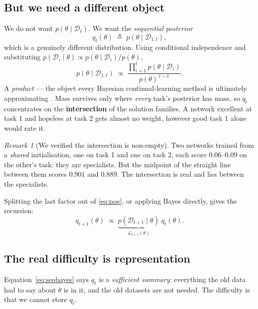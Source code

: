 \documentclass[11pt]{article}
\theoremstyle{definition}
\theoremstyle{plain}
\theoremstyle{remark}
\newtheorem{remark}[definition]{Remark}
\newcommand{\Dt}{\mathcal{D}}
\newcommand{\Lh}{\mathcal{L}}
\begin{document}
\subsection{But we need a different object}

We do not want $p(\theta \mid \Dt_t)$. We want the \emph{sequential posterior}
\begin{equation}
q_t(\theta) \;\triangleq\; p(\theta \mid \Dt_{1:t}),
\end{equation}
which is a genuinely different distribution. Using conditional independence and
substituting $p(\Dt_i\mid\theta) \propto p(\theta\mid\Dt_i)/p(\theta)$,
\begin{equation}
p(\theta \mid \Dt_{1:t}) \;\propto\;
\frac{\prod_{i=1}^{t} p(\theta \mid \Dt_i)}{p(\theta)^{\,t-1}} .
\label{eq:poe}
\end{equation}
A \emph{product} --- the object every Bayesian continual-learning method is
ultimately approximating \cite{vcl}. Mass survives only where \emph{every} task's posterior has
mass, so $q_t$ concentrates on the \textbf{intersection} of the solution
families. A network excellent at task 1 and hopeless at task 2 gets almost no
weight, however good task 1 alone would rate it.

\begin{remark}[We verified the intersection is non-empty]
Two networks trained from a \emph{shared} initialisation, one on task 1 and one
on task 2, each score $0.06$--$0.09$ on the other's task: they are specialists.
But the midpoint of the straight line between them scores $0.901$ and $0.889$.
The intersection is real and lies between the specialists.
\end{remark}

Splitting the last factor out of \eqref{eq:poe}, or applying Bayes directly,
gives the recursion:
\begin{equation}
q_{t+1}(\theta) \;\propto\; \underbrace{p(\Dt_{t+1} \mid \theta)}_{\Lh_{t+1}(\theta)} \; q_t(\theta).
\label{eq:seqbayes}
\end{equation}

\subsection{The real difficulty is representation}

Equation~\eqref{eq:seqbayes} says $q_t$ is a \emph{sufficient summary}:
everything the old data had to say about $\theta$ is in it, and the old datasets
are not needed. The difficulty is that we cannot store $q_t$.
\end{document}
